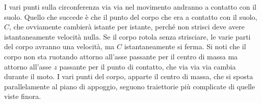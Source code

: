 \documentclass[10pt,a4paper]{book}
\begin{document}
\FloatBarrier
I vari punti sulla circonferenza via via nel movimento andranno a contatto con il suolo. Quello che succede è che il punto del corpo che era a contatto con il suolo, $C$, che ovviamente cambierà istante per istante, perché non strisci deve avere istantaneamente velocità nulla. Se il corpo rotola senza strisciare, le varie parti del corpo avranno una velocità, ma $C$ istantaneamente si ferma. Si noti che il corpo non sta ruotando attorno all'asse passante per il centro di massa ma attorno all'asse $z$ passante per il punto di contatto, che via via via cambia durante il moto. I vari punti del corpo, apparte il centro di massa, che si sposta parallelamente al piano di appoggio, seguono traiettorie più complicate di quelle viste finora.
\begin{figure}[htpb]
	\centering
	

	 
	\tikzset{
	pattern size/.store in=\mcSize, 
	pattern size = 5pt,
	pattern thickness/.store in=\mcThickness, 
	pattern thickness = 0.3pt,
	pattern radius/.store in=\mcRadius, 
	pattern radius = 1pt}
	\makeatletter
	\makeatother

	\begin{tikzpicture}[x=0.75pt,y=0.75pt,yscale=-1,xscale=1]


\end{tikzpicture}
\end{figure}
\end{document}
